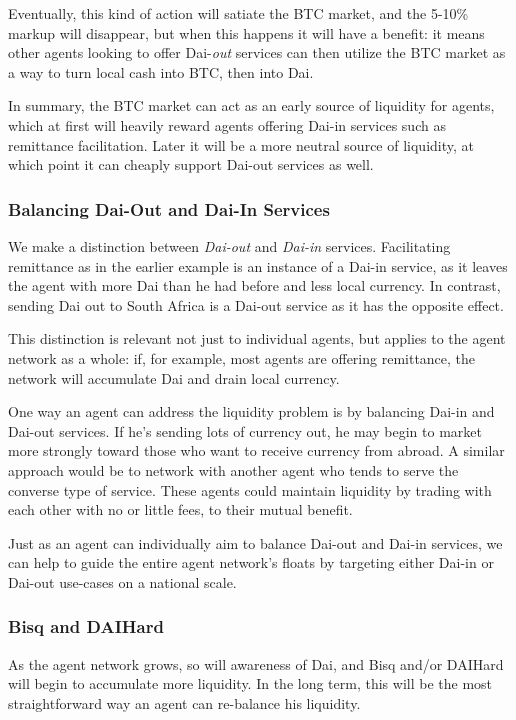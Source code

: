 \documentclass{article}
\begin{document}
Eventually, this kind of action will satiate the BTC market, and the 5-10\% markup will disappear, but when this happens it will have a benefit: it means other agents looking to offer Dai-\textit{out} services can then utilize the BTC market as a way to turn local cash into BTC, then into Dai.

In summary, the BTC market can act as an early source of liquidity for agents, which at first will heavily reward agents offering Dai-in services such as remittance facilitation. Later it will be a more neutral source of liquidity, at which point it can cheaply support Dai-out services as well.

\subsubsection{Balancing Dai-Out and Dai-In Services} \label{dai-out dai-in}

We make a distinction between \textit{Dai-out} and \textit{Dai-in} services. Facilitating remittance as in the earlier example is an instance of a Dai-in service, as it leaves the agent with more Dai than he had before and less local currency. In contrast, sending Dai out to South Africa is a Dai-out service as it has the opposite effect.

This distinction is relevant not just to individual agents, but applies to the agent network as a whole: if, for example, most agents are offering remittance, the network will accumulate Dai and drain local currency.

One way an agent can address the liquidity problem is by balancing Dai-in and Dai-out services. If he's sending lots of currency out, he may begin to market more strongly toward those who want to receive currency from abroad. A similar approach would be to network with another agent who tends to serve the converse type of service. These agents could maintain liquidity by trading with each other with no or little fees, to their mutual benefit.

Just as an agent can individually aim to balance Dai-out and Dai-in services, we can help to guide the entire agent network's floats by targeting either Dai-in or Dai-out use-cases on a national scale.

\subsubsection{Bisq and DAIHard} \label{exchanges insufficient}

As the agent network grows, so will awareness of Dai, and Bisq and/or DAIHard will begin to accumulate more liquidity. In the long term, this will be the most straightforward way an agent can re-balance his liquidity.
\end{document}
